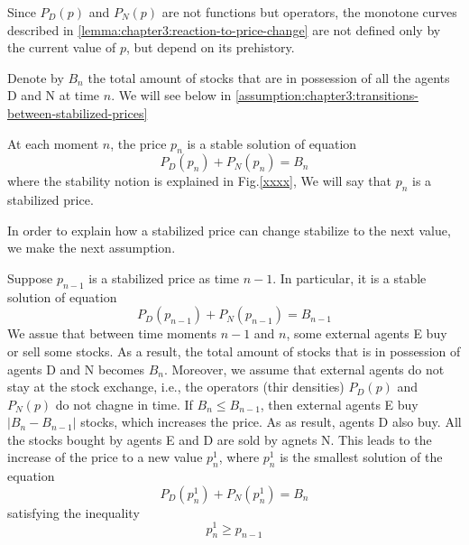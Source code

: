 \begin{assumption}
\begin{remark}\label{remark:chapter3:1}
  Since $P_D(p)$ and $P_N(p)$ are not functions but operators, the monotone curves described in \ref{lemma:chapter3:reaction-to-price-change} are not defined only by the current value of $p$, but depend on its prehistory.
\end{remark}

Denote by $B_n$ the total amount of stocks that are in possession of all the agents D and N at time $n$. We will see below in \ref{assumption:chapter3:transitions-between-stabilized-prices}

\begin{assumption}\label{assumption:chapter3:demand/supply-price-formation}
  At each moment $n$, the price $p_n$ is a stable solution of equation
  \begin{equation}\label{eqn:chapter3:demand-supply-price-formation}
    P_D(p_n) + P_N(p_n) = B_n
  \end{equation}
  where the stability notion is explained in Fig.\ref{xxxx}, We will say that $p_n$ is a stabilized price.
\end{assumption}

In order to explain how a stabilized price can change stabilize to the next value, we make the next assumption.

\begin{assumption}\label{assumption:chapter3:transitions-between-stabilized-prices}
  Suppose $p_{n-1}$ is a stabilized price as time $n-1$. In particular, it is a stable solution of equation
  \begin{equation}\label{eqn:chapter3:stable-price-eqn}
    P_D(p_{n-1}) + P_N(p_{n-1}) = B_{n-1}
  \end{equation}
  We assue that between time moments $n-1$ and $n$, some external agents E buy or sell some stocks. As a result, the total amount of stocks that is in possession of agents D and N becomes $B_n$. Moreover, we assume that external agents do not stay at the stock exchange, i.e., the operators (thir densities) $P_D(p)$ and $P_N(p)$ do not chagne in time.
  If $B_n \le B_{n-1}$, then external agents E buy $|B_{n}-B_{n-1}|$ stocks, which increases the price. As as result, agents D also buy. All the stocks bought by agents E and D are sold by agnets N. This leads to the increase of the price to a new value $p_n^1$, where $p_n^1$ is the smallest solution of the equation
  \begin{equation}\label{eqn:chapter3:new-stable-price-eqn}
    P_D(p_n^1) + P_N(p_n^1) = B_n
  \end{equation}
  satisfying the inequality
  \begin{equation}
    p_n^1 \ge p_{n-1}
  \end{equation}


\end{assumption}
\end{assumption}
